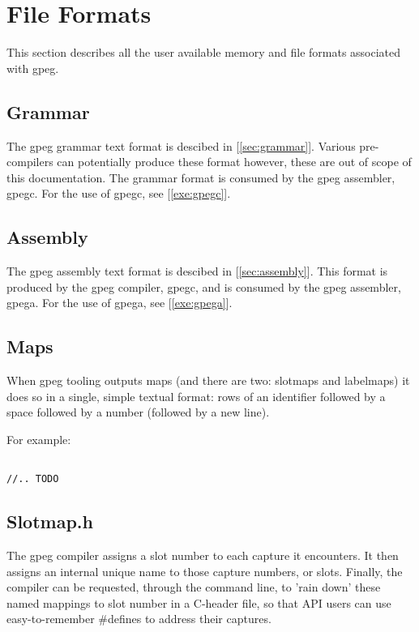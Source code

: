 \section{File Formats}

This section describes all the user available memory and file formats
associated with gpeg.

\subsection{Grammar}

The gpeg grammar text format is descibed in [\ref{sec:grammar}].
Various pre-compilers can potentially produce these format however,
these are out of scope of this documentation. The grammar format is
consumed by the gpeg assembler, gpegc. For the use of gpegc, see
[\ref{exe:gpegc}].

\subsection{Assembly}

The gpeg assembly text format is descibed in [\ref{sec:assembly}].
This format is produced by the gpeg compiler, gpegc,
and is consumed by the gpeg assembler, gpega.
For the use of gpega, see [\ref{exe:gpega}].

\subsection{Maps}

When gpeg tooling outputs maps (and there are two: slotmaps and labelmaps)
it does so in a single, simple textual format: rows of an identifier followed
by a space followed by a number (followed by a new line).

For example:

\begin{myquote}
\begin{verbatim}

//.. TODO

\end{verbatim}
\end{myquote}

\subsection{Slotmap.h}

The gpeg compiler assigns a slot number to each capture it encounters.
It then assigns an internal unique name to those capture numbers, or slots.
Finally, the compiler can be requested, through the command line, to
'rain down' these named mappings to slot number in a C-header file, so that
API users can use easy-to-remember \#defines to address their captures.

